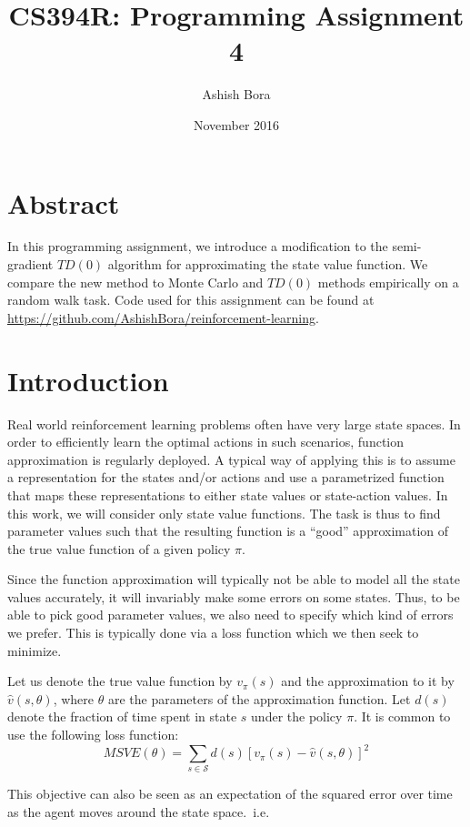 \documentclass{article}
\title{CS394R\@: Programming Assignment 4}
\author{Ashish Bora}
\date{November 2016}
\begin{document}
\maketitle

\section{Abstract}

In this programming assignment, we introduce a modification to the semi-gradient $TD(0)$ algorithm for approximating the state value function. We compare the new method to Monte Carlo and $TD(0)$ methods empirically on a random walk task. Code used for this assignment can be found at \url{https://github.com/AshishBora/reinforcement-learning}.

\section{Introduction}

Real world reinforcement learning problems often have very large state spaces. In order to efficiently learn the optimal actions in such scenarios, function approximation is regularly deployed. A typical way of applying this is to assume a representation for the states and/or actions and use a parametrized function that maps these representations to either state values or state-action values. In this work, we will consider only state value functions. The task is thus to find parameter values such that the resulting function is a ``good'' approximation of the true value function of a given policy $\pi$.

Since the function approximation will typically not be able to model all the state values accurately, it will invariably make some errors on some states. Thus, to be able to pick good parameter values, we also need to specify which kind of errors we prefer. This is typically done via a loss function which we then seek to minimize.

Let us denote the true value function by $v_{\pi}(s)$ and the approximation to it by $\hat{v}(s, \theta)$, where $\theta$ are the parameters of the approximation function. Let $d(s)$ denote the fraction of time spent in state $s$ under the policy $\pi$. It is common to use the following loss function:
$$MSVE(\theta) = \sum_{s \in \mathcal{S}} d(s) {\left[v_{\pi}(s) - \hat{v}(s, \theta) \right]}^2$$

This objective can also be seen as an expectation of the squared error over time as the agent moves around the state space.\ i.e.
\end{document}
